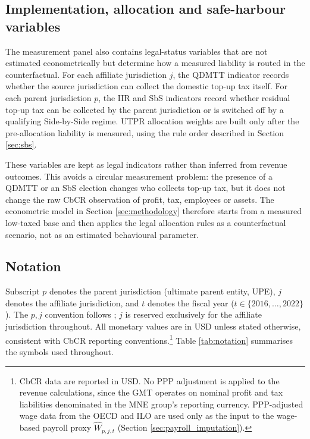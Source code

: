 \documentclass[11pt,a4paper]{article}
\begin{document}
\subsection{Implementation, allocation and safe-harbour variables}\label{sec:implementation_variables}

The measurement panel also contains legal-status variables that are not estimated econometrically but determine how a measured liability is routed in the counterfactual. For each affiliate jurisdiction $j$, the QDMTT indicator records whether the source jurisdiction can collect the domestic top-up tax itself. For each parent jurisdiction $p$, the IIR and SbS indicators record whether residual top-up tax can be collected by the parent jurisdiction or is switched off by a qualifying Side-by-Side regime. UTPR allocation weights are built only after the pre-allocation liability is measured, using the rule order described in Section \ref{sec:sbs}.

These variables are kept as legal indicators rather than inferred from revenue outcomes. This avoids a circular measurement problem: the presence of a QDMTT or an SbS election changes who collects top-up tax, but it does not change the raw CbCR observation of profit, tax, employees or assets. The econometric model in Section \ref{sec:methodology} therefore starts from a measured low-taxed base and then applies the legal allocation rules as a counterfactual scenario, not as an estimated behavioural parameter.

\subsection{Notation}\label{sec:notation}

Subscript $p$ denotes the parent jurisdiction (ultimate parent entity, UPE), $j$ denotes the affiliate jurisdiction, and $t$ denotes the fiscal year ($t \in \{2016, \ldots, 2022\}$). The $p,j$ convention follows \citet{barake2022}; $j$ is reserved exclusively for the affiliate jurisdiction throughout. All monetary values are in USD unless stated otherwise, consistent with CbCR reporting conventions.\footnote{CbCR data are reported in USD. No PPP adjustment is applied to the revenue calculations, since the GMT operates on nominal profit and tax liabilities denominated in the MNE group's reporting currency. PPP-adjusted wage data from the OECD and ILO are used only as the input to the wage-based payroll proxy $\hat{W}_{p,j,t}$ (Section \ref{sec:payroll_imputation}).} Table \ref{tab:notation} summarises the symbols used throughout.
\end{document}
